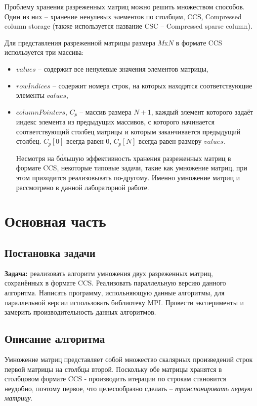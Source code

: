 \documentclass[a4paper,12pt]{article}
\begin{document}
Проблему хранения разреженных матриц можно решить множеством способов. Один из них -- хранение ненулевых элементов по столбцам, CCS, Compressed column storage (также используется название CSC -- Compressed sparse column).

Для представления разреженной матрицы размера $M$x$N$ в формате CCS используется три массива:

\begin{itemize}
\item $values$ -- содержит все ненулевые значения элементов матрицы,
\item $rowIndices$ -- содержит номера строк, на которых находятся соответствующие элементы $values$,
\item $columnPointers$, $C_p$ -- массив размера $N+1$, каждый элемент которого задаёт индекс элемента из предыдущих массивов, с которого начинается соответствующий столбец матрицы и которым заканчивается предыдущий столбец. $C_p[0]$ всегда равен 0, $C_p[N]$ всегда равен размеру $values$.

Несмотря на б\'{о}льшую эффективность хранения разреженных матриц в формате CCS, некоторые типовые задачи, такие как умножение матриц, при этом приходится реализовывать по-другому. Именно умножение матриц и рассмотрено в данной лабораторной работе.

\end{itemize}
\newpage
\section{Основная часть}
\subsection{Постановка задачи}
\textbf{Задача:} реализовать алгоритм умножения двух разреженных матриц, сохранённых в формате CCS. Реализовать параллельную версию данного алгоритма. Написать программу, испольняющую данные алгоритмы, для параллельной версии использовать библиотеку MPI. Провести эксперименты и замерить производительность данных алгоритмов.
\subsection{Описание алгоритма}

Умножение матриц представляет собой множество скалярных произведений строк первой матрицы на столбцы второй. Поскольку обе матрицы хранятся в столбцовом формате CCS - производить итерации по строкам становится неудобно, поэтому первое, что целесообразно сделать -- \textit{транспонировать первую матрицу}.
\end{document}
